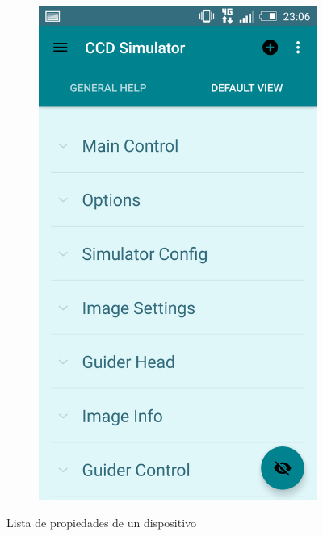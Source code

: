 \begin{figure}
\begin{subfigure}[]{0.4\textwidth}
        \caption{}
        \label{fig:captura8}
    \end{subfigure}
    \begin{subfigure}[]{0.4\textwidth}
        \includegraphics[width=\textwidth]{../images/captura11.png}
        \caption{}
        \label{fig:captura9}
    \end{subfigure}
    \caption{Lista de propiedades de un dispositivo}\label{fig:capturas5}
\end{figure}

